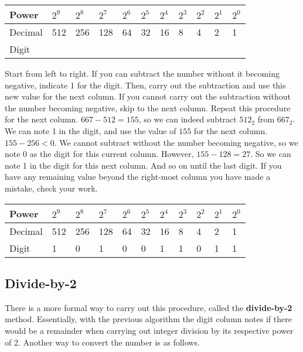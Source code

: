 \vspace{1em} %
\begin{tabular}{|l|l|l|l|l|l|l|l|l|l|l|}\hline
Power & $2^9$ & $2^8$ & $2^7$ & $2^6$ & $2^5$ & $2^4$ & $2^3$ & $2^2$ & $2^1$ & $2^0$ \\\hline\hline
Decimal & 512 & 256 & 128 & 64 & 32 & 16 & 8 & 4 & 2 & 1 \\\hline
Digit &  &  &  &  &  &  &  &  &  &  \\\hline
\end{tabular}
\vspace{1em}

Start from left to right. If you can subtract the number without it becoming negative, indicate 1 for the digit. %
Then, carry out the subtraction and use this new value for the next column. If you cannot carry out the subtraction %
without the number becoming negative, skip to the next column. Repeat this procedure for the next column. %
$667-512=155$, so we can indeed subtract $512_2$ from $667_2$. We can note 1 in the digit, and use the value of $155$ %
for the next column. $155-256<0$. We cannot subtract without the number becoming negative, so we note 0 as the digit %
for this current column. However, $155-128=27$. So we can note 1 in the digit for this next column. And so on until %
the last digit. If you have any remaining value beyond the right-most column you have made a mistake, check your work. %

\vspace{1em} %
\begin{tabular}{|l|l|l|l|l|l|l|l|l|l|l|}\hline
Power & $2^9$ & $2^8$ & $2^7$ & $2^6$ & $2^5$ & $2^4$ & $2^3$ & $2^2$ & $2^1$ & $2^0$ \\\hline\hline
Decimal & 512 & 256 & 128 & 64 & 32 & 16 & 8 & 4 & 2 & 1 \\\hline
Digit & 1 & 0 & 1 & 0 & 0 & 1 & 1 & 0 & 1 & 1 \\\hline
\end{tabular}
\vspace{1em}

\subsection{Divide-by-2\label{sec:numbers:divideby2}}

There is a more formal way to carry out this procedure, called the \textbf{divide-by-2} method. Essentially, with the previous 
algorithm the digit column notes if there would be a remainder when carrying out integer division by its respective power of 2. 
Another way to convert the number is as follows.

